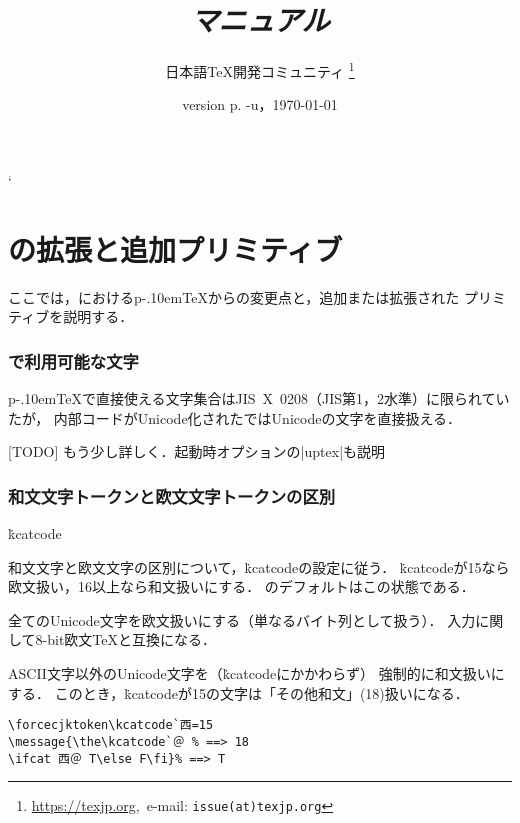 \documentclass[uplatex,a4paper,11pt,nomag]{jsarticle}
\def\pTeX{p\kern-.10em\TeX}
\begin{document}
\catcode`
\title{\emph{\upTeX マニュアル}}
\author{日本語\TeX 開発コミュニティ\null
\thanks{\url{https://texjp.org},\ e-mail: \texttt{issue(at)texjp.org}}}
\date{version p\the\ptexversion.\the\ptexminorversion\ptexrevision
             -u\the\uptexversion\uptexrevision，\today}
\maketitle

\tableofcontents

\newpage

\part{\upTeX の拡張と追加プリミティブ}

ここでは，\upTeX における\pTeX からの変更点と，追加または拡張された
プリミティブを説明する．

\section{\upTeX で利用可能な文字}
\label{sec:uptexchar}

\pTeX で直接使える文字集合はJIS~X~0208（JIS第1，2水準）に限られていたが，
内部コードがUnicode化された\upTeX ではUnicodeの文字を直接扱える．

[TODO] もう少し詳しく．起動時オプションの|uptex|も説明

\section{和文文字トークンと欧文文字トークンの区別}
\.{kcatcode}%

\begin{cslist}
 \csitem[\.{enablecjktoken}]
  和文文字と欧文文字の区別について，\.{kcatcode}の設定に従う．
  \.{kcatcode}が15なら欧文扱い，16以上なら和文扱いにする．
  \upTeX のデフォルトはこの状態である．

 \csitem[\.{disablecjktoken}]
  全てのUnicode文字を欧文扱いにする（単なるバイト列として扱う）．
  入力に関して8-bit欧文\TeX と互換になる．

 \csitem[\.{forcecjktoken}]
  ASCII文字以外のUnicode文字を（\.{kcatcode}にかかわらず）
  強制的に和文扱いにする．
  このとき，\.{kcatcode}が15の文字は「その他和文」(18)扱いになる．
\begin{verbatim}
\forcecjktoken\kcatcode`西=15
\message{\the\kcatcode`＠ % ==> 18
\ifcat 西＠ T\else F\fi}% ==> T
\end{verbatim}
\end{cslist}
\end{document}
